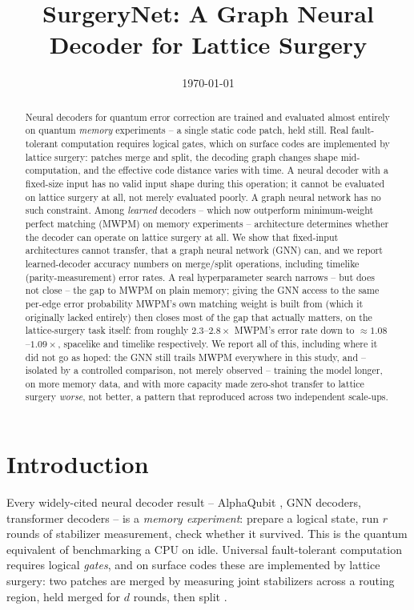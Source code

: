 \documentclass[11pt]{article}
\title{SurgeryNet: A Graph Neural Decoder for Lattice Surgery}
\author{}
\date{\today}
\begin{document}
\maketitle

\begin{abstract}
Neural decoders for quantum error correction are trained and evaluated almost
entirely on quantum \emph{memory} experiments -- a single static code patch,
held still. Real fault-tolerant computation requires logical gates, which on
surface codes are implemented by lattice surgery: patches merge and split, the
decoding graph changes shape mid-computation, and the effective code distance
varies with time. A neural decoder with a fixed-size input has no valid input
shape during this operation; it cannot be evaluated on lattice surgery at all,
not merely evaluated poorly. A graph neural network has no such constraint.
Among \emph{learned} decoders -- which now outperform minimum-weight perfect
matching (MWPM) on memory experiments -- architecture determines whether the
decoder can operate on lattice surgery at all. We show that fixed-input
architectures cannot transfer, that a graph neural network (GNN) can, and we
report learned-decoder accuracy numbers on merge/split operations, including
timelike (parity-measurement) error rates. A real hyperparameter search
narrows -- but does not close -- the gap to MWPM on plain memory; giving the
GNN access to the same per-edge error probability MWPM's own matching
weight is built from (which it originally lacked entirely) then closes most
of the gap that actually matters, on the lattice-surgery task itself: from
roughly $2.3$--$2.8\times$ MWPM's error rate down to $\approx 1.08$--$1.09\times$,
spacelike and timelike respectively. We report all of this, including where
it did not go as hoped: the GNN still trails MWPM everywhere in this study,
and -- isolated by a controlled comparison, not merely observed -- training
the model longer, on more memory data, and with more capacity made
zero-shot transfer to lattice surgery \emph{worse}, not better, a pattern
that reproduced across two independent scale-ups.
\end{abstract}

\section{Introduction}

Every widely-cited neural decoder result -- AlphaQubit \cite{alphaqubit}, GNN
decoders, transformer decoders -- is a \emph{memory experiment}: prepare a
logical state, run $r$ rounds of stabilizer measurement, check whether it
survived. This is the quantum equivalent of benchmarking a CPU on idle.
Universal fault-tolerant computation requires logical \emph{gates}, and on
surface codes these are implemented by lattice surgery: two patches are
merged by measuring joint stabilizers across a routing region, held merged
for $d$ rounds, then split \cite{horsman2012}.
\end{document}
